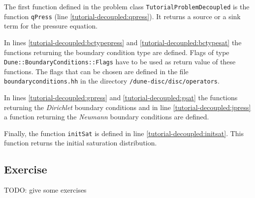 The first function defined in the problem class \texttt{TutorialProblemDecoupled} is the function \texttt{qPress} (line \ref{tutorial-decoupled:qpress}). It returns a source or a sink term for the pressure equation. 

In lines \ref{tutorial-decoupled:bctypepress} and \ref{tutorial-decoupled:bctypesat} the functions returning the boundary condition type are defined. Flags of type \texttt{Dune::BoundaryConditions::Flags} have to be used as return value of these functions. The flags that can be chosen are defined in the file \texttt{boundaryconditions.hh} in the directory \texttt{/dune-disc/disc/operators}.

In lines \ref{tutorial-decoupled:gpress} and \ref{tutorial-decoupled:gsat} the functions returning the \textit{Dirichlet} boundary conditions and in line \ref{tutorial-decoupled:jpress} a function returning the \textit{Neumann} boundary conditions are defined.

Finally, the function \texttt{initSat} is defined in line \ref{tutorial-decoupled:initsat}. This function returns the initial saturation distribution.

\subsection{Exercise}
TODO: give some exercises
